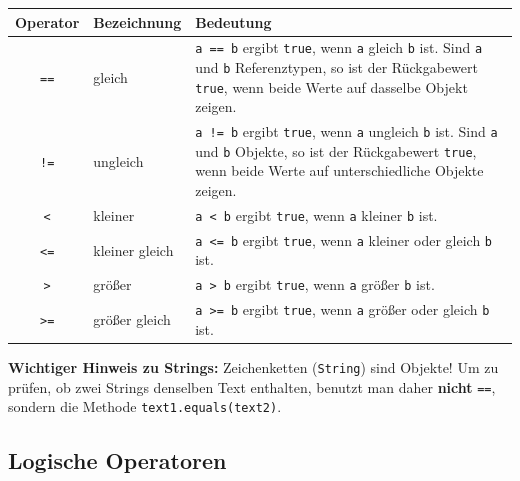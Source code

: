\begin{tabularx}{\textwidth}{|c|l|X|}\hline
\textbf{Operator} & \textbf{Bezeichnung} & \textbf{Bedeutung}
\\ \hline
\texttt{==} & gleich & \texttt{a == b} ergibt \texttt{true}, wenn
\texttt{a} gleich \texttt{b} ist. Sind \texttt{a} und
\texttt{b} Referenztypen, so ist der Rückgabewert \texttt{true}, wenn beide Werte auf dasselbe Objekt zeigen.
\\ \hline
\texttt{!=} & ungleich & \texttt{a != b} ergibt \texttt{true},
wenn \texttt{a} ungleich \texttt{b} ist. Sind \texttt{a} und
\texttt{b} Objekte, so ist der Rückgabewert
\texttt{true}, wenn beide Werte auf unterschiedliche Objekte zeigen.
\\ \hline
\texttt{<} & kleiner & \texttt{a < b} ergibt \texttt{true}, wenn
\texttt{a} kleiner \texttt{b} ist.
\\ \hline
\texttt{<=} & kleiner gleich & \texttt{a <= b} ergibt
\texttt{true}, wenn \texttt{a} kleiner oder gleich \texttt{b}
ist.
\\ \hline
\texttt{>} & größer & \texttt{a > b} ergibt \texttt{true}, wenn
\texttt{a} größer \texttt{b} ist.
\\ \hline
\texttt{>=} & größer gleich & \texttt{a >= b} ergibt
\texttt{true}, wenn \texttt{a} größer oder gleich \texttt{b}
ist.
\\ \hline
\end{tabularx}

\medskip
\noindent \textbf{Wichtiger Hinweis zu Strings:} Zeichenketten (\lstinline|String|)
sind Objekte! Um zu prüfen, ob zwei Strings denselben Text enthalten, benutzt
man daher \textbf{nicht} \lstinline|==|, sondern die Methode
\lstinline|text1.equals(text2)|.


\subsection{Logische Operatoren}

